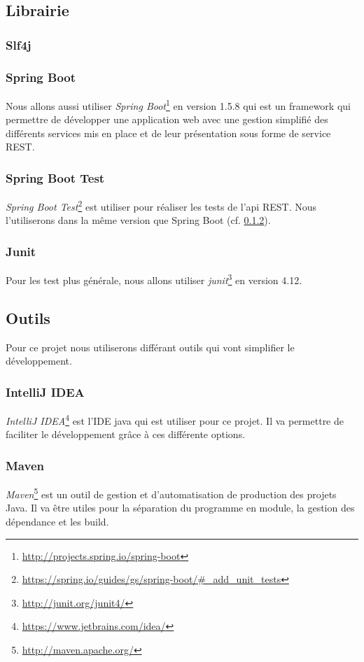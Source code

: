 \documentclass[12pt]{article}
\begin{document}
\subsection{Librairie}

\subsubsection{Slf4j}

\subsubsection{Spring Boot} \label{SpringBoot}
Nous allons aussi utiliser \textit{Spring Boot}\footnote{\url{http://projects.spring.io/spring-boot}} en version 1.5.8 qui est un framework qui permettre de développer une application web avec une gestion simplifié des différents services mis en place et de leur présentation sous forme de service REST.

\subsubsection{Spring Boot Test}
\textit{Spring Boot Test}\footnote{\url{https://spring.io/guides/gs/spring-boot/\#_add_unit_tests}} est utiliser pour réaliser les tests de l'api REST. Nous l'utiliserons dans la même version que Spring Boot (cf. \ref{SpringBoot}).

\subsubsection{Junit}
Pour les test plus générale, nous allons utiliser \textit{junit}\footnote{\url{http://junit.org/junit4/}} en version 4.12.



\subsection{Outils}
Pour ce projet nous utiliserons différant outils qui vont simplifier le développement.


\subsubsection{IntelliJ IDEA}
\textit{IntelliJ IDEA}\footnote{\url{https://www.jetbrains.com/idea/}} est l'IDE java qui est utiliser pour ce projet. Il va permettre de faciliter le développement grâce à ces différente options.


\subsubsection{Maven}
\textit{Maven}\footnote{\url{http://maven.apache.org/}} est un outil de gestion et d'automatisation de production des projets Java. Il va être utiles pour la séparation du programme en module, la gestion des dépendance et les build.
\end{document}
